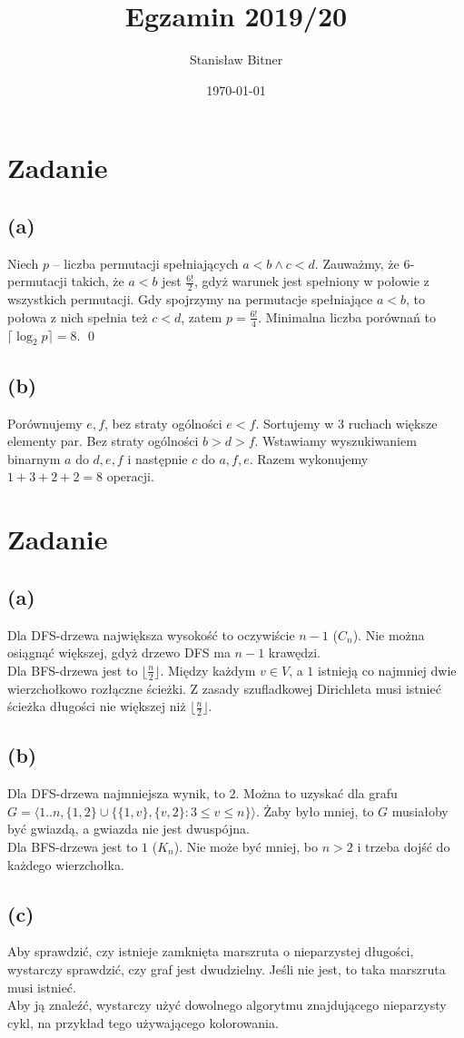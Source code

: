\documentclass[12pt, a4paper]{article}
\title{Egzamin 2019/20}
\author{Stanisław Bitner}
\date{\today}
\newcounter{zadanie}
\newcommand{\zadanie}{\addtocounter{zadanie}{1}\section*{Zadanie \arabic{zadanie}}}
\begin{document}
\maketitle
\zadanie{}
\subsection*{(a)}
Niech $p$ -- liczba permutacji spełniających $a<b \land c<d$. Zauważmy, że
6-permutacji takich, że $a<b$ jest $\frac{6!}{2}$, gdyż warunek jest spełniony
w połowie z wszystkich permutacji. Gdy spojrzymy na permutacje spełniające
$a<b$, to połowa z nich spełnia też $c<d$, zatem $p = \frac{6!}{4}$. Minimalna
liczba porównań to $\lceil\log_2{p}\rceil = 8$. \qed

\subsection*{(b)}
Porównujemy $e,f$, bez straty ogólności $e<f$. Sortujemy w $3$ ruchach większe
elementy par. Bez straty ogólności $b>d>f$. Wstawiamy wyszukiwaniem binarnym
$a$ do $d,e,f$ i następnie $c$ do $a,f,e$. Razem wykonujemy $1+3+2+2 = 8$
operacji.

\zadanie{}
\subsection*{(a)}
Dla DFS-drzewa największa wysokość to oczywiście $n-1$ ($C_n$). Nie można
osiągnąć większej, gdyż drzewo DFS ma $n-1$ krawędzi.\\
Dla BFS-drzewa jest to $\lfloor\frac{n}{2}\rfloor$. Między każdym $v \in V$,
a $1$ istnieją co najmniej dwie wierzchołkowo rozłączne ścieżki. Z zasady
szufladkowej Dirichleta musi istnieć ścieżka długości nie większej niż
$\lfloor\frac{n}{2}\rfloor$.

\subsection*{(b)}
Dla DFS-drzewa najmniejsza wynik, to $2$. Można to uzyskać dla grafu\\
$G = \langle1..n, \{1,2\}\cup\{\{1,v\},\{v,2\} : 3\le v\le n\}\rangle$. Żaby
było mniej, to $G$ musiałoby być gwiazdą, a gwiazda nie jest dwuspójna.\\
Dla BFS-drzewa jest to $1$ ($K_n$). Nie może być mniej, bo $n>2$ i trzeba dojść
do każdego wierzchołka.

\subsection*{(c)}
Aby sprawdzić, czy istnieje zamknięta marszruta o nieparzystej długości,
wystarczy sprawdzić, czy graf jest dwudzielny. Jeśli nie jest, to taka
marszruta musi istnieć.\\
Aby ją znaleźć, wystarczy użyć dowolnego algorytmu znajdującego nieparzysty
cykl, na przykład tego używającego kolorowania.
\end{document}
